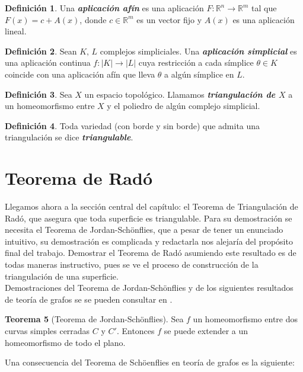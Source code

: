 \documentclass[10pt]{report}
\newcommand{\R}{\mathbb{R}}
\newcommand{\enfatiza}[1]{\textbf{\textit{#1}}}
\theoremstyle{definition}
\newtheorem{defin}{Definición}[section]
\newtheorem{tma}[defin]{Teorema}
\begin{document}
\begin{defin}
Una \enfatiza{aplicación afín} es una aplicación $F:\R^n \to \R^m$ tal que $F(x)=c+A(x)$, donde $c\in \R^m$ es un vector fijo y $A(x)$ es una aplicación lineal.
\end{defin}
\begin{defin}
Sean $K, \, L$ complejos simpliciales. Una \enfatiza{aplicación simplicial} es una aplicación continua $f:|K|\to |L|$ cuya restricción a cada símplice $\theta \in K$ coincide con una aplicación afín que lleva $\theta$ a algún símplice en $L$.
\end{defin}
\begin{defin}%
Sea $X$ un espacio topológico. Llamamos \enfatiza{triangulación de $X$} a un homeomorfismo entre $X$ y el poliedro de algún complejo simplicial.
\end{defin}

\begin{defin}%
Toda variedad (con borde y sin borde) que admita una triangulación se dice \enfatiza{triangulable}.
\end{defin}



\section{Teorema de Radó}
Llegamos ahora a la sección central del capítulo: el Teorema de Triangulación de Radó, que asegura que toda superficie es triangulable. Para su demostración se necesita el Teorema de Jordan-Schönflies, que a pesar de tener un enunciado intuitivo, su demostración es complicada y redactarla nos alejaría del propósito final del trabajo. Demostrar el Teorema de Radó asumiendo este resultado es de todas maneras instructivo, pues se ve el proceso de construcción de la triangulación de una superficie.\\

Demostraciones del Teorema de Jordan-Schönflies y de los siguientes resultados de teoría de grafos se se pueden consultar en \cite{thomassen}.

\begin{tma}[Teorema de Jordan-Schönflies]
Sea $f$ un homeomorfismo entre dos curvas simples cerradas $C$ y $C'$. Entonces $f$ se puede extender a un homeomorfismo de todo el plano.
\end{tma}

Una consecuencia del Teorema de Schöenflies en teoría de grafos es la siguiente:
\end{document}
